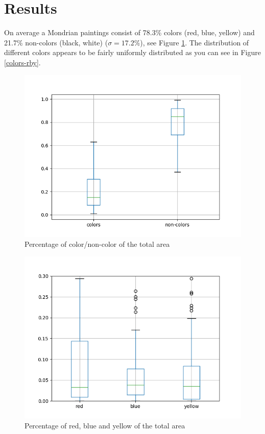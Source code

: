 \section{Results}


On average a Mondrian paintings consist of 78.3\% colors (red, blue, yellow) and
21.7\% non-colors (black, white) ($\sigma = 17.2\%$), see Figure
\ref{fig:colors-noncolors}. The distribution of different colors appears to be
fairly uniformly distributed as you can see in Figure \ref{colors-rby}.

\begin{figure}
  \includegraphics[width=\linewidth]{images/colors-non-colors.png}
  \caption{Percentage of color/non-color of the total area}
  \label{fig:colors-noncolors}
\end{figure}

\begin{figure}
  \includegraphics[width=\linewidth]{images/colors-rby.png}
  \caption{Percentage of red, blue and yellow of the total area}
  \label{fig:colors-rby}
\end{figure}

